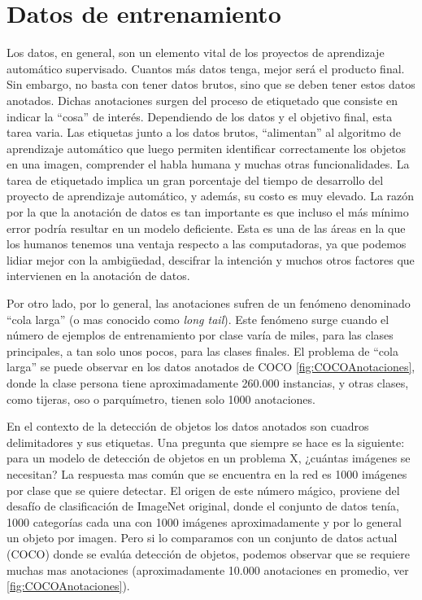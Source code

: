 \section{Datos de entrenamiento} \label{sec:datosdeentrenamiento}
Los datos, en general, son un elemento vital de los proyectos de aprendizaje automático supervisado. Cuantos más datos tenga, mejor será el producto final. Sin embargo, no basta con tener datos brutos, sino que se deben tener estos datos anotados. Dichas anotaciones surgen del proceso de etiquetado que consiste en indicar la ``cosa'' de interés. Dependiendo de los datos y el objetivo final, esta tarea varia. Las etiquetas junto a los datos brutos, ``alimentan'' al algoritmo de aprendizaje automático que luego permiten identificar correctamente los objetos en una imagen, comprender el habla humana y muchas otras funcionalidades. La tarea de etiquetado implica un gran porcentaje del tiempo de desarrollo del proyecto de aprendizaje automático, y además, su costo es muy elevado. La razón por la que la anotación de datos es tan importante es que incluso el más mínimo error podría resultar en un modelo deficiente. Esta es una de las áreas en la que los humanos tenemos una ventaja respecto a las computadoras, ya que podemos lidiar mejor con la ambigüedad, descifrar la intención y muchos otros factores que intervienen en la anotación de datos.

Por otro lado, por lo general, las anotaciones sufren de un fenómeno denominado ``cola larga'' (o mas conocido como \textit{long tail}). Este fenómeno surge cuando  el número de ejemplos de entrenamiento por clase varía de miles, para las clases principales, a tan solo unos pocos, para las clases finales. El problema de ``cola larga'' se puede observar en los datos anotados de COCO  \autoref{fig:COCOAnotaciones}, donde la clase persona tiene aproximadamente 260.000 instancias, y otras clases, como tijeras, oso o parquímetro, tienen solo 1000 anotaciones.

En el contexto de la detección de objetos los datos anotados son cuadros delimitadores y sus etiquetas. Una pregunta que siempre se hace es la siguiente: para un modelo de detección de objetos en un problema X, ¿cuántas imágenes se necesitan? La respuesta mas común que se encuentra en la red es 1000 imágenes por clase que se quiere detectar. El origen de este número mágico, proviene del desafío de clasificación de ImageNet original, donde el conjunto de datos tenía, 1000 categorías cada una con 1000 imágenes aproximadamente y por lo general un objeto por imagen. Pero si lo comparamos con un conjunto de datos actual (COCO) donde se evalúa detección de objetos, podemos observar que se requiere muchas mas anotaciones (aproximadamente 10.000 anotaciones en promedio, ver \autoref{fig:COCOAnotaciones}).

